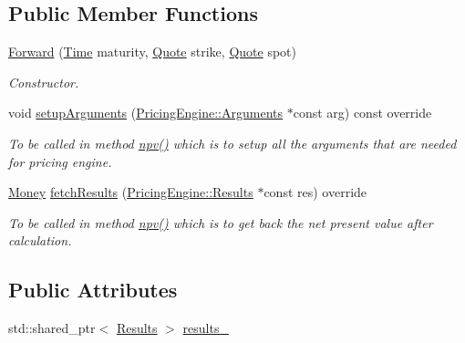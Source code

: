 \subsection*{Public Member Functions}
\begin{DoxyCompactItemize}
\item 
\hyperlink{class_forward_a7ec14e1a089290cae0e70c4cddd353b5}{Forward} (\hyperlink{_name_def_8h_ac2d3e0ba793497bcca555c7c2cf64ff3}{Time} maturity, \hyperlink{_name_def_8h_a642a6c5fd87319d922637de0e0bb0305}{Quote} strike, \hyperlink{_name_def_8h_a642a6c5fd87319d922637de0e0bb0305}{Quote} spot)
\begin{DoxyCompactList}\small\item\em Constructor. \end{DoxyCompactList}\item 
void \hyperlink{class_forward_a909ab0cefa0ab42bdaf3bf6e84ac0096}{setup\+Arguments} (\hyperlink{class_pricing_engine_1_1_arguments}{Pricing\+Engine\+::\+Arguments} $\ast$const arg) const override
\begin{DoxyCompactList}\small\item\em To be called in method \hyperlink{class_instrument_aa750f2ae95a21d65a073da3171e8d084}{npv()} which is to setup all the arguments that are needed for pricing engine. \end{DoxyCompactList}\item 
\hyperlink{_name_def_8h_a5a9d48c16a694e9a2d9f1eca730dc8c5}{Money} \hyperlink{class_forward_ab1e2edeb8345c8605013634a598d1ae5}{fetch\+Results} (\hyperlink{class_pricing_engine_1_1_results}{Pricing\+Engine\+::\+Results} $\ast$const res) override
\begin{DoxyCompactList}\small\item\em To be called in method \hyperlink{class_instrument_aa750f2ae95a21d65a073da3171e8d084}{npv()} which is to get back the net present value after calculation. \end{DoxyCompactList}\end{DoxyCompactItemize}
\subsection*{Public Attributes}
\begin{DoxyCompactItemize}
\item 
std\+::shared\+\_\+ptr$<$ \hyperlink{class_forward_1_1_results}{Results} $>$ \hyperlink{class_forward_abead12e748980177fb67f98bcffbf817}{results\+\_\+}
\end{DoxyCompactItemize}
